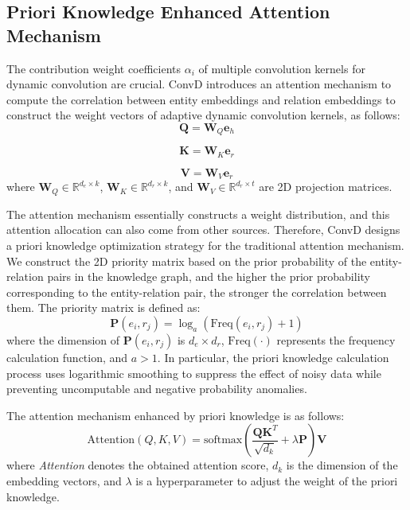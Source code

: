 \documentclass[letterpaper]{article} %
\begin{document}
\subsection{Priori Knowledge Enhanced Attention Mechanism}
The contribution weight coefficients $\alpha_{i}$ of multiple convolution kernels for dynamic convolution are crucial. ConvD introduces an attention mechanism to compute the correlation between entity embeddings and relation embeddings to construct the weight vectors of adaptive dynamic convolution kernels, as follows:
\begin{equation}
    \boldsymbol{Q}=\boldsymbol{W}_{Q}\boldsymbol{e}_{h}
\end{equation}

\begin{equation}
    \boldsymbol{K}=\boldsymbol{W}_{K}\boldsymbol{e}_{r}
\end{equation}

\begin{equation}
    \boldsymbol{V}=\boldsymbol{W}_{V}\boldsymbol{e}_{r}
\end{equation}
where $\boldsymbol{W}_{Q} \in \mathbb{R}^{d_{e} \times k}$, $\boldsymbol{W}_{K} \in \mathbb{R}^{d_{r} \times k}$, and $\boldsymbol{W}_{V} \in \mathbb{R}^{d_{r} \times t}$ are 2D projection matrices.

The attention mechanism essentially constructs a weight distribution, and this attention allocation can also come from other sources. Therefore, ConvD designs a priori knowledge optimization strategy for the traditional attention mechanism. We construct the 2D priority matrix based on the prior probability of the entity-relation pairs in the knowledge graph, and the higher the prior probability corresponding to the entity-relation pair, the stronger the correlation between them. The priority matrix is defined as:
\begin{equation}
    \boldsymbol{P}(e_{i},r_{j})=\log_{a} \left ( \mathrm{Freq}(e_{i},r_{j})+1 \right ) 
\end{equation}
where the dimension of $\boldsymbol{P}(e_{i},r_{j})$ is $d_{e} \times d_{r}$, $\mathrm{Freq}(\cdot)$ represents the frequency calculation function, and $a>1$. In particular, the priori knowledge calculation process uses logarithmic smoothing to suppress the effect of noisy data while preventing uncomputable and negative probability anomalies.

The attention mechanism enhanced by priori knowledge is as follows:
\begin{equation}
    \mathrm{Attention}(Q,K,V) = \mathrm{softmax} \left ( \frac {\boldsymbol{Q}\boldsymbol{K}^{T}}{\sqrt {d_{k}}} + \lambda \boldsymbol{P} \right ) \boldsymbol{V}
\end{equation}
where \textit{Attention} denotes the obtained attention score, $d_k$ is the dimension of the embedding vectors, and $\lambda$ is a hyperparameter to adjust the weight of the priori knowledge.
\end{document}
